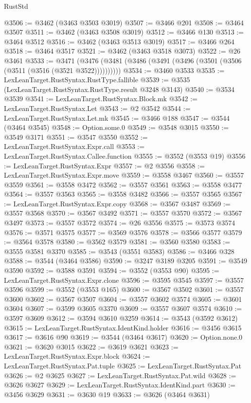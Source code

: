 \begin{lexlean}{RustStd}
\begin{coremodule}
@3506 := @3462 (@3463 @3503 @3019)
@3507 := @3466 @201
@3508 := @3464 @3507
@3511 := @3462 (@3463 @3508 @3019)
@3512 := @3466 @130
@3513 := @3464 @3512
@3516 := @3462 (@3463 @3513 @3019)
@3517 := @3466 @264
@3518 := @3464 @3517
@3521 := @3462 (@3463 @3518 @3073)
@3522 := @26 @3461
@3533 := @3471 (@3476 (@3481 (@3486 (@3491 (@3496 (@3501 (@3506 (@3511 (@3516 (@3521 @3522))))))))))
@3534 := @3460 @3533
@3535 := LexLeanTarget.RustSyntax.RustType.fallible
@3539 := @3535 (LexLeanTarget.RustSyntax.RustType.result @3248 @3143)
@3540 := @3534 @3539
@3541 := LexLeanTarget.RustSyntax.Block.mk
@3542 := LexLeanTarget.RustSyntax.Let
@3543 := @2 @3542
@3544 := LexLeanTarget.RustSyntax.Let.mk
@3545 := @3466 @188
@3547 := @3544 (@3464 @3545)
@3548 := Option.some.{0}
@3549 := @3548 @3015
@3550 := @3549 @3171
@3551 := @3547 @3550
@3552 := LexLeanTarget.RustSyntax.Expr.call
@3553 := LexLeanTarget.RustSyntax.Callee.function
@3555 := @3552 (@3553 @19)
@3556 := LexLeanTarget.RustSyntax.Expr
@3557 := @2 @3556
@3558 := LexLeanTarget.RustSyntax.Expr.move
@3559 := @3558 @3467
@3560 := @3557 @3559
@3561 := @3558 @3472
@3562 := @3557 @3561
@3563 := @3558 @3477
@3564 := @3557 @3563
@3565 := @3558 @3482
@3566 := @3557 @3565
@3567 := LexLeanTarget.RustSyntax.Expr.copy
@3568 := @3567 @3487
@3569 := @3557 @3568
@3570 := @3567 @3492
@3571 := @3557 @3570
@3572 := @3567 @3497
@3573 := @3557 @3572
@3574 := @26 @3556
@3575 := @3573 @3574
@3576 := @3571 @3575
@3577 := @3569 @3576
@3578 := @3566 @3577
@3579 := @3564 @3578
@3580 := @3562 @3579
@3581 := @3560 @3580
@3583 := @3555 @3581 @3370
@3585 := @3543 (@3551 @3583)
@3586 := @3466 @328
@3588 := @3544 (@3464 @3586)
@3590 := @3247 @3189 @3205
@3591 := @3549 @3590
@3592 := @3588 @3591
@3594 := @3552 (@3553 @90)
@3595 := LexLeanTarget.RustSyntax.Expr.clone
@3596 := @3595 @3545
@3597 := @3557 @3596
@3599 := @3552 (@3553 @165)
@3600 := @3567 @3502
@3601 := @3557 @3600
@3602 := @3567 @3507
@3604 := @3557 @3602 @3574
@3605 := @3601 @3604
@3607 := @3599 @3605 @3370
@3609 := @3557 @3607 @3574
@3610 := @3597 @3609
@3612 := @3594 @3610 @3259
@3614 := @3543 (@3592 @3612)
@3615 := LexLeanTarget.RustSyntax.IdentKind.holder
@3616 := @3456 @3615
@3617 := @3616 @90
@3619 := @3544 (@3464 @3617)
@3620 := Option.none.{0}
@3621 := @3620 @3015
@3622 := @3619 @3621
@3623 := LexLeanTarget.RustSyntax.Expr.block
@3624 := LexLeanTarget.RustSyntax.Pat.tuple
@3625 := LexLeanTarget.RustSyntax.Pat
@3626 := @2 @3625
@3627 := LexLeanTarget.RustSyntax.Pat.wild
@3628 := @3626 @3627
@3629 := LexLeanTarget.RustSyntax.IdentKind.part
@3630 := @3456 @3629
@3631 := @3630 @19
@3633 := @3626 (@3464 @3631)

\end{coremodule}
\end{lexlean}
